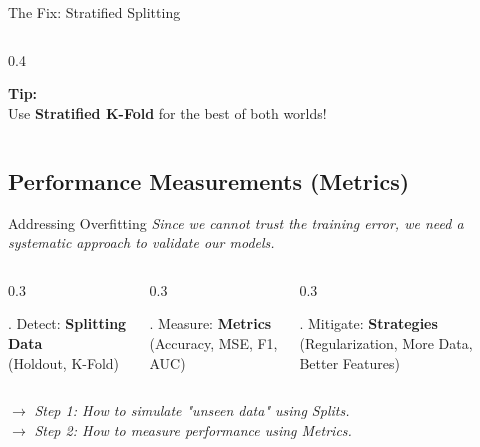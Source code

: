 \begin{frame}{The Fix: Stratified Splitting}
\begin{columns}[c]
\begin{column}{0.4\textwidth}
            \vspace{1em}
            \begin{tcolorbox}[colback=green!5, colframe=green!40]
                \centering \small
                \textbf{Tip:}\\
                Use \textbf{Stratified K-Fold} for the best of both worlds!
            \end{tcolorbox}
        \end{column}
    \end{columns}
    
\end{frame}


\subsection{Performance Measurements (Metrics)}

\begin{frame}{Addressing Overfitting}
    \centering
    \large \textit{Since we cannot trust the training error, we need a systematic approach to validate our models.}
    
    \vspace{0.8cm}
    
    \begin{columns}[T]
        \begin{column}{0.3\textwidth}
            \begin{block}{. Detect:}
                \centering
                \textbf{Splitting Data}\\
                (Holdout, K-Fold)
            \end{block}
        \end{column}
        \begin{column}{0.3\textwidth}
            \begin{block}{. Measure:}
                \centering
                \textbf{Metrics}\\
                (Accuracy, MSE, F1, AUC)
            \end{block}
        \end{column}
        \begin{column}{0.3\textwidth}
            \begin{block}{. Mitigate:}
                \centering
                \textbf{Strategies}\\
                (Regularization, More Data, Better Features)
            \end{block}
        \end{column}
    \end{columns}
    
    \vspace{0.5cm}
    \centering
    \small $\rightarrow$ \textit{Step 1: How to simulate "unseen data" using Splits.} \\
    \small $\rightarrow$ \textit{Step 2: How to measure performance using Metrics.}
\end{frame}


